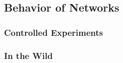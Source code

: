 \subsection{Behavior of Networks}

\subsubsection{Controlled Experiments}

\subsubsection{In the Wild}
